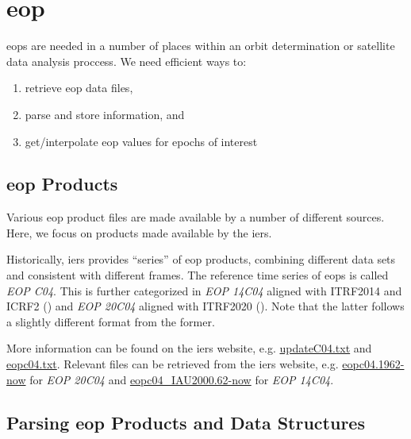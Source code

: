 \section{\gls{eop}}\label{sec:eop}

\glspl{eop} are needed in a number of places within an orbit determination or 
satellite data analysis proccess. We need efficient ways to:
\begin{enumerate}
  \item retrieve \gls{eop} data files, 
  \item parse and store information, and 
  \item get/interpolate \gls{eop} values for epochs of interest
\end{enumerate}

\subsection{\gls{eop} Products}\label{ssec:eop-products}

Various \gls{eop} product files are made available by a number of different 
sources. Here, we focus on products made available by the \gls{iers}. 

Historically, \gls{iers} provides ``series'' of \gls{eop} products, combining 
different data sets and consistent with different frames. The reference time 
series of \glspl{eop} is called \emph{EOP C04}. This is further categorized in 
\emph{EOP 14C04} aligned with ITRF2014 and ICRF2 (\cite{Bizouard2019}) and 
\emph{EOP 20C04} aligned with ITRF2020 (\cite{iersmail471}). Note that the latter 
follows a slightly different format from the former.

More information can be found on the \gls{iers} website, e.g. 
\href{https://hpiers.obspm.fr/iers/eop/eopc04_14/updateC04.txt}{updateC04.txt} 
and \href{https://hpiers.obspm.fr/iers/eop/eopc04/eopc04.txt}{eopc04.txt}. 
Relevant files can be retrieved from the \gls{iers} website, e.g. 
\href{https://hpiers.obspm.fr/iers/eop/eopc04/eopc04.1962-now}{eopc04.1962-now} for 
\emph{EOP 20C04} and \href{https://hpiers.obspm.fr/iers/eop/eopc04_14/eopc04_IAU2000.62-now}{eopc04\_IAU2000.62-now} 
for \emph{EOP 14C04}.

\subsection{Parsing \gls{eop} Products and Data Structures}\label{ssec:parsing-eop-products-and-data-structures}

